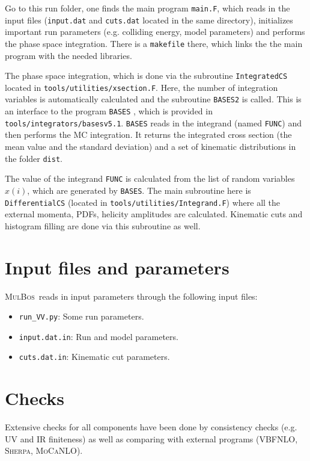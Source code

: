 \documentclass[english,12pt]{article}
\newcommand{\vbfnlo}{\textsc{VBFNLO}}
\newcommand{\mulbos}{\textsc{MulBos}}
\newcommand{\sherpa}{\textsc{Sherpa}}
\newcommand{\mocanlo}{\textsc{MoCaNLO}}
\begin{document}
Go to this run folder, one finds the main program {\tt main.F}, which reads in the input files 
({\tt input.dat} and {\tt cuts.dat} located in the same directory), 
initializes important run parameters (e.g. colliding energy, model parameters) 
and performs the phase space integration. There is a {\tt makefile} there, which links the 
the main program with the needed libraries.

The phase space integration, which is done via 
the subroutine {\tt IntegratedCS} located in {\tt tools/utilities/xsection.F}. 
Here, the number of integration variables is automatically calculated and 
the subroutine {\tt BASES2} is called. 
This is an interface to the program {\tt BASES} \cite{Kawabata:1995th}, 
which is provided in {\tt tools/integrators/basesv5.1}. 
{\tt BASES} reads in the integrand (named {\tt FUNC}) and then 
performs the MC integration. 
It returns the integrated cross section (the mean value and the standard deviation) 
and a set of kinematic distributions in the folder {\tt dist}. 

The value of the integrand {\tt FUNC} is calculated from the list of random variables $x(i)$, 
which are generated by {\tt BASES}. 
The main subroutine here is {\tt DifferentialCS} (located in {\tt tools/utilities/Integrand.F}) where all 
the external momenta, PDFs, helicity amplitudes are calculated. 
Kinematic cuts and histogram filling are done via this subroutine as well.
\section{Input files and parameters}
\label{sec:input} 
\mulbos\ reads in input parameters through the following input files:
\begin{itemize}
\item {\tt run\_VV.py}: Some run parameters.
\item {\tt input.dat.in}: Run and model parameters.
\item {\tt cuts.dat.in}: Kinematic cut parameters.
\end{itemize}
\section{Checks}
Extensive checks for all components have been done by consistency checks (e.g. UV and IR finiteness) 
as well as comparing with external programs (\vbfnlo, \sherpa \cite{Hoppe:2023uux}, \mocanlo \cite{Denner:2026phn}). 
\end{document}
